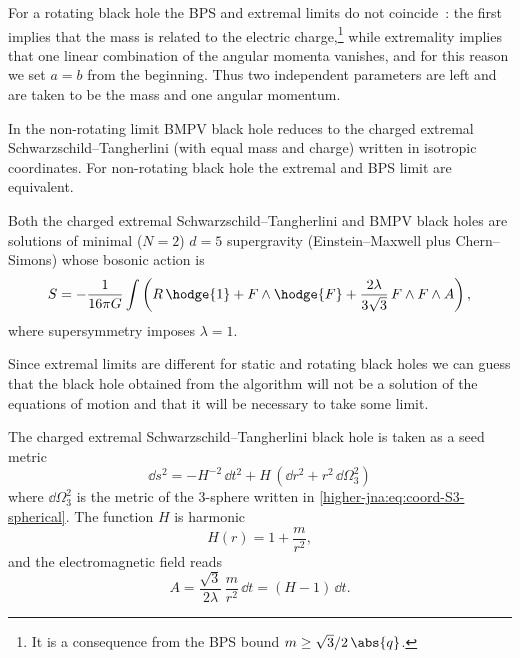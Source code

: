 For a rotating black hole the BPS and extremal limits do not coincide~\cites[sec.~7.2]{Emparan:2008:BlackHolesHigher}[sec.~1]{Gauntlett:1999:BlackHolesD5}: the first implies that the mass is related to the electric charge,\footnote{It is a consequence from the BPS bound $m \ge \sqrt{3}/2\, \abs{q}$.} while extremality\footnotemark{}%
implies that one linear combination of the angular momenta vanishes, and for this reason we set $a = b$ from the beginning.\footnotemark{}%
Thus two independent parameters are left and are taken to be the mass and one angular momentum.

In the non-rotating limit BMPV black hole reduces to the charged extremal Schwarz\-schild--Tangherlini (with equal mass and charge) written in isotropic coordinates.
For non-rotating black hole the extremal and BPS limit are equivalent.

Both the charged extremal Schwarzschild--Tangherlini and BMPV black holes are solutions of minimal ($N = 2$) $d = 5$ supergravity (Einstein--Maxwell plus Chern--Simons) whose bosonic action is~\cites[sec.~1]{Gauntlett:1999:BlackHolesD5}[sec.~2]{Aliev:2014:SuperradianceBlackHole}[sec.~2]{Gauntlett:2003:AllSupersymmetricSolutions}
\begin{equation}
	\label{higher-jna:higher-jna:action:N=2-d=5-sugra}
	S = - \frac{1}{16\pi G} \int \left(R\, \hodge{1} + F \wedge \hodge{F} + \frac{2\lambda}{3 \sqrt{3}}\, F \wedge F \wedge A \right),
\end{equation} 
where supersymmetry imposes $\lambda = 1$.

Since extremal limits are different for static and rotating black holes we can guess that the black hole obtained from the algorithm will not be a solution of the equations of motion and that it will be necessary to take some limit.

The charged extremal Schwarzschild--Tangherlini black hole is taken as a seed metric~\cites[sec.~3.2]{Gauntlett:2003:AllSupersymmetricSolutions}[sec.~4]{Gibbons:1994:SupersymmetricSelfGravitatingSolitons}[sec.~1.3.1]{Puhm:2013:BlackHolesString}
\begin{equation}
	\label{higher-jna:metric:5d-bmpv}
	\dd s^2 = - H^{-2}\, \dd t^2 + H\, (\dd r^2 + r^2\, \dd\Omega_3^2 )
\end{equation} 
where $\dd\Omega_3^2$ is the metric of the $3$-sphere written in
\eqref{higher-jna:eq:coord-S3-spherical}.
The function $H$ is harmonic
\begin{equation}
	H(r) = 1 + \frac{m}{r^2},
\end{equation} 
and the electromagnetic field reads
\begin{equation}
	\label{higher-jna:pot:5d-bmpv}
	A = \frac{\sqrt{3}}{2 \lambda}\, \frac{m}{r^2}\, \dd t
		= (H - 1)\, \dd t.
\end{equation} 


